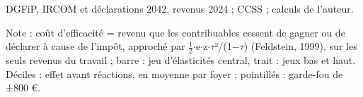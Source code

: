 DGFiP, IRCOM et déclarations 2042, revenus 2024 ; CCSS ; calculs de l'auteur.\par Note : coût d'efficacité = revenu que les contribuables cessent de gagner ou de déclarer à cause de l'impôt, approché par $\frac{1}{2}$$\cdot$e$\cdot$z$\cdot$$\tau$²/(1$-$$\tau$) (Feldstein, 1999), sur les seuls revenus du travail ; barre : jeu d'élasticités central, trait : jeux bas et haut. Déciles : effet avant réactions, en moyenne par foyer ; pointillés : garde-fou de ±800 \euro{}.
